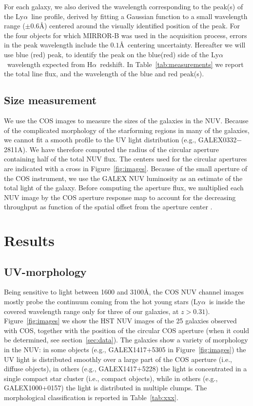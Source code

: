 \documentclass[manuscript]{emulateapj}
\newcommand{\lya}{Ly$\alpha$}
\newcommand{\ha}{H$\alpha$}
\begin{document}
For each galaxy, we also derived the wavelength
corresponding to the peak(s) of the \lya\ line profile, derived by
fitting a Gaussian function to a small wavelength range ($\pm 0.6$\AA)
centered around the visually identified position of the peak. For the
four objects for which MIRROR-B was used in the acquisition process,
errors in the peak wavelength include the $0.1$\AA\ centering
uncertainty.  Hereafter we will use blue (red) peak, to identify the
peak on the blue(red) side of the \lya\ wavelength expected from \ha\
redshift. In Table~\ref{tab:measurements} we report the total line
flux, and the wavelength of the blue and red peak(s).


\subsection{Size measurement}
We use the COS images to measure the sizes of the galaxies in the NUV.
Because of the complicated morphology of the starforming regions in
many of the galaxies, we cannot fit a smooth profile to the UV light
distribution (e.g., GALEX0332$-$2811A). We have therefore computed the
radius of the circular aperture containing half of the total NUV
flux. The centers used for the circular apertures are indicated with a
cross in Figure~\ref{fig:images}.  Because of the small aperture of
the COS instrument, we use the GALEX NUV luminosity as an estimate of
the total light of the galaxy. Before computing the aperture flux, we
multiplied each NUV image by the COS aperture response map to account
for the decreasing throughput as function of the spatial offset from
the aperture center \citep{Goudfrooij2010}.

\section{Results}
\subsection{UV-morphology}
Being sensitive to light between 1600 and 3100\AA, the COS NUV channel
images mostly probe the continuum coming from the hot young stars
(\lya\ is inside the covered wavelength range only for three of our
galaxies, at $z>0.31$). Figure~\ref{fig:images} we show the HST NUV
images of the 25 galaxies observed with COS, together with the
position of the circular COS aperture (when it could be determined,
see section~\ref{sec:data}). The galaxies show a variety of morphology
in the NUV: in some objects (e.g., GALEX1417$+$5305 in
Figure~\ref{fig:images}) the UV light is distributed smoothly over a
large part of the COS aperture (i.e., diffuse objects), in others
(e.g., GALEX1417$+$5228) the light is concentrated in a single compact
star cluster (i.e., compact objects), while in others (e.g.,
GALEX1000$+$0157) the light is distributed in multiple clumps.  The
morphological classification is reported in Table~\ref{tab:xxx}.
\end{document}
